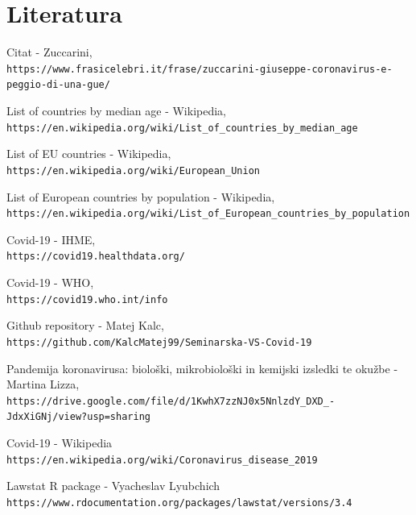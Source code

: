\documentclass[a4paper,11pt]{article}
\begin{document}
\section{Literatura}

\begin{thebibliography}{9}

Citat - Zuccarini,
\\\texttt{https://www.frasicelebri.it/frase/zuccarini-giuseppe-coronavirus-e-peggio-di-una-gue/}

List of countries by median age - Wikipedia,
\\\texttt{https://en.wikipedia.org/wiki/List\_of\_countries\_by\_median\_age}

List of EU countries - Wikipedia,
\\\texttt{https://en.wikipedia.org/wiki/European\_Union}


List of European countries by population - Wikipedia,
\\\texttt{https://en.wikipedia.org/wiki/List\_of\_European\_countries\_by\_population}


Covid-19 - IHME,
\\\texttt{https://covid19.healthdata.org/}


Covid-19 - WHO,
\\\texttt{https://covid19.who.int/info}


Github repository - Matej Kalc,
\\\texttt{https://github.com/KalcMatej99/Seminarska-VS-Covid-19}


Pandemija koronavirusa: biološki, mikrobiološki in kemijski izsledki te okužbe - Martina Lizza,
\\\texttt{https://drive.google.com/file/d/1KwhX7zzNJ0x5NnlzdY\_DXD\_-JdxXiGNj/view?usp=sharing}

Covid-19 - Wikipedia
\\\texttt{https://en.wikipedia.org/wiki/Coronavirus\_disease\_2019}

Lawstat R package - Vyacheslav Lyubchich
\\\texttt{https://www.rdocumentation.org/packages/lawstat/versions/3.4}



\end{thebibliography}
\end{document}

